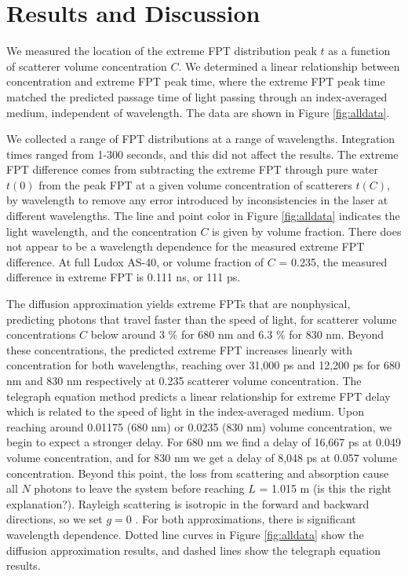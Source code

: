 \documentclass[9pt,twocolumn,twoside]{opticajnl}
\begin{document}
\section{Results and Discussion}

We measured the location of the extreme FPT distribution peak $t$ as a function of scatterer volume concentration $C$. We determined a linear relationship between concentration and extreme FPT peak time, where the extreme FPT peak time matched the predicted passage time of light passing through an index-averaged medium, independent of wavelength. The data are shown in Figure \ref{fig:alldata}.

We collected a range of FPT distributions at a range of wavelengths. Integration times ranged from 1-300 seconds, and this did not affect the results. The extreme FPT difference comes from subtracting the extreme FPT through pure water $t\left(0\right)$ from the peak FPT at a given volume concentration of scatterers $t\left(C\right)$, by wavelength to remove any error introduced by inconsistencies in the laser at different wavelengths. The line and point color in Figure \ref{fig:alldata} indicates the light wavelength, and the concentration $C$ is given by volume fraction. There does not appear to be a wavelength dependence for the measured extreme FPT difference. At full Ludox AS-40, or volume fraction of $C$ = 0.235, the measured difference in extreme FPT is 0.111 ns, or 111 ps. 

The diffusion approximation yields extreme FPTs that are nonphysical, predicting photons that travel faster than the speed of light, for scatterer volume concentrations $C$ below around 3 \% for 680 nm and 6.3 \% for 830 nm. Beyond these concentrations, the predicted extreme FPT increases linearly with concentration for both wavelengths, reaching over 31,000 ps and 12,200 ps for 680 nm and 830 nm respectively at 0.235 scatterer volume concentration. 
The telegraph equation method predicts a linear relationship for extreme FPT delay which is related to the speed of light in the index-averaged medium. Upon reaching around 0.01175 (680 nm) or 0.0235 (830 nm) volume concentration, we begin to expect a stronger delay. For 680 nm we find a delay of 16,667 ps at 0.049 volume concentration, and for 830 nm we get a delay of 8,048 ps at 0.057 volume concentration. Beyond this point, the loss from scattering and absorption cause all $N$ photons to leave the system before reaching $L$ = 1.015 m {\color{violet}(is this the right explanation?)}. Rayleigh scattering is isotropic in the forward and backward directions, so we set $g=0$ \cite{bohren_absorption_1983}. For both approximations, there is significant wavelength dependence. Dotted line curves in Figure \ref{fig:alldata} show the diffusion approximation results, and dashed lines show the telegraph equation results.
\end{document}
